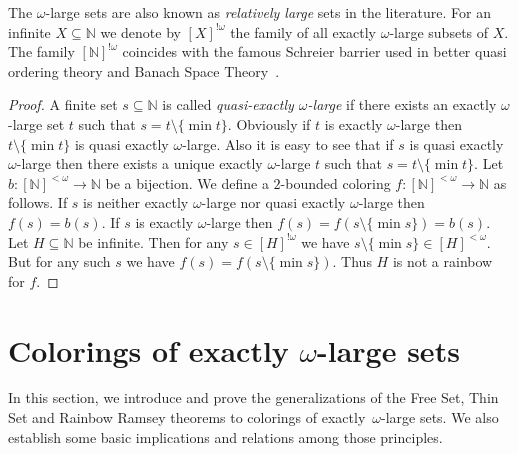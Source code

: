 \documentclass{article}
\newcommand{\RRT}[0]{\mathsf{RRT}}
\newcommand{\NN}[0]{\mathbb{N}}
\numberwithin{theorem}{section}
\newtheorem{proposition}[theorem]{Proposition}
\begin{document}
The $\omega$-large sets are also known as {\em relatively large} sets in the literature. For an infinite $X\subseteq \NN$ we denote by $[X]^{!\omega}$ the family of all exactly $\omega$-large subsets of $X$.
The family $[\NN]^{!\omega}$ coincides with the famous Schreier barrier used in better quasi ordering theory and Banach Space Theory~\cite{Todorcevic+2010}.


\begin{proof}
A finite set $s \subseteq \NN$ is called {\em quasi-exactly $\omega$-large} if there exists an exactly $\omega$-large set $t$ such that
$s= t \setminus \{\min t\}$. Obviously if $t$ is exactly $\omega$-large then $t\setminus \{\min t\}$ is quasi exactly $\omega$-large. Also it
is easy to see that if $s$ is quasi exactly $\omega$-large then there exists a unique exactly $\omega$-large $t$ such that $s = t \setminus \{\min t\}$.
Let $b:[\NN]^{<\omega} \to \NN$ be a bijection. We define a $2$-bounded coloring $f:[\NN]^{<\omega} \to \NN$ as follows. 
If $s$ is neither exactly $\omega$-large nor quasi exactly $\omega$-large then $f(s) = b(s)$. If $s$ is exactly $\omega$-large then $f(s) = f(s\setminus \{\min s\}) = b(s).$
Let $H\subseteq \NN$ be infinite. Then for any $s \in [H]^{!\omega}$ we have $s\setminus \{\min s\} \in [H]^{<\omega}$. 
But for any such $s$ we have $f(s) = f(s\setminus \{\min s\})$. Thus $H$ is not a rainbow for $f$. 

\end{proof}

\section{Colorings of exactly $\omega$-large sets}\label{sec:fs_ts_rainbow_from_rt}

In this section, we introduce and prove the generalizations of the Free Set, Thin Set and Rainbow Ramsey theorems to colorings of exactly~$\omega$-large sets. We also establish some basic implications and relations among those principles.
\end{document}
